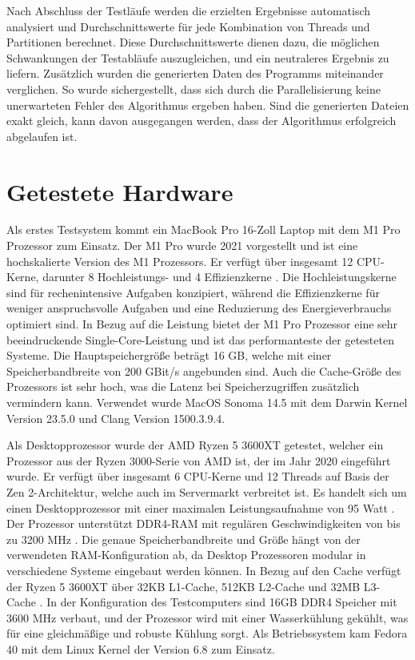 Nach Abschluss der Testläufe werden die erzielten Ergebnisse automatisch analysiert und Durchschnittswerte für jede Kombination von Threads und Partitionen berechnet. Diese Durchschnittswerte dienen dazu, die möglichen Schwankungen der Testabläufe auszugleichen, und ein neutraleres Ergebnis zu liefern. Zusätzlich wurden die generierten Daten des Programms miteinander verglichen. So wurde sichergestellt, dass sich durch die Parallelisierung keine unerwarteten Fehler des Algorithmus ergeben haben. Sind die generierten Dateien exakt gleich, kann davon ausgegangen werden, dass der Algorithmus erfolgreich abgelaufen ist.

\section{Getestete Hardware}
\label{sec:tested_hardware}

Als erstes Testsystem kommt ein MacBook Pro 16-Zoll Laptop mit dem M1 Pro Prozessor zum Einsatz. Der M1 Pro wurde 2021 vorgestellt und ist eine hochskalierte Version des M1 Prozessors. Er verfügt über insgesamt 12 CPU-Kerne, darunter 8 Hochleistungs- und 4 Effizienzkerne \citep{MacBook_Technische_Daten}. Die Hochleistungskerne sind für rechenintensive Aufgaben konzipiert, während die Effizienzkerne für weniger anspruchsvolle Aufgaben und eine Reduzierung des Energieverbrauchs optimiert sind.
In Bezug auf die Leistung bietet der M1 Pro Prozessor eine sehr beeindruckende Single-Core-Leistung und ist das performanteste der getesteten Systeme. Die Hauptspeichergröße beträgt 16 GB, welche mit einer Speicherbandbreite von 200 GBit/s \citep{MacBook_Technische_Daten} angebunden sind. Auch die Cache-Größe des Prozessors ist sehr hoch, was die Latenz bei Speicherzugriffen zusätzlich vermindern kann.
Verwendet wurde MacOS Sonoma 14.5 mit dem Darwin Kernel Version 23.5.0 und Clang Version 1500.3.9.4.

Als Desktopprozessor wurde der AMD Ryzen 5 3600XT getestet, welcher ein Prozessor aus der Ryzen 3000-Serie von AMD ist, der im Jahr 2020 eingeführt wurde. Er verfügt über insgesamt 6 CPU-Kerne und 12 Threads auf Basis der Zen 2-Architektur, welche auch im Servermarkt verbreitet ist. Es handelt sich um einen Desktopprozessor mit einer maximalen Leistungsaufnahme von 95 Watt \citep{Ryzen_Technische_Daten}.
Der Prozessor unterstützt DDR4-RAM mit regulären Geschwindigkeiten von bis zu 3200 MHz \citep{Ryzen_Technische_Daten}. Die genaue Speicherbandbreite und Größe hängt von der verwendeten RAM-Konfiguration ab, da Desktop Prozessoren modular in verschiedene Systeme eingebaut werden können.
In Bezug auf den Cache verfügt der Ryzen 5 3600XT über 32KB L1-Cache, 512KB L2-Cache und 32MB L3-Cache \citep{Ryzen_Technische_Daten}. In der Konfiguration des Testcomputers sind 16GB DDR4 Speicher mit 3600 MHz verbaut, und der Prozessor wird mit einer Wasserkühlung gekühlt, was für eine gleichmäßige und robuste Kühlung sorgt. Als Betriebssystem kam Fedora 40 mit dem Linux Kernel der Version 6.8 zum Einsatz.

